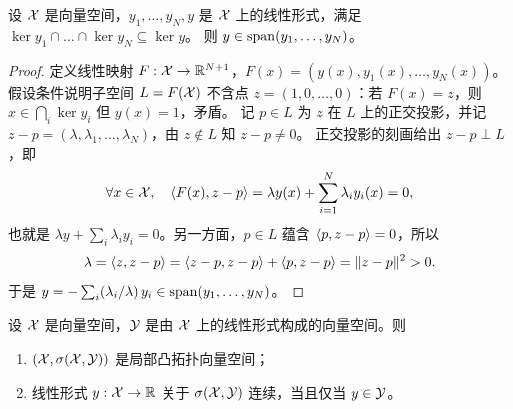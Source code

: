 \begin{lemma}
\label{res:75}
设 $\mathcal{X}$ 是向量空间，$y_1,\dots,y_N,y$ 是 $\mathcal{X}$ 上的线性形式，满足 $\ker y_1\cap\dots\cap\ker y_N\subseteq\ker y$。
则 $y\in\operatorname{span}(y_1,\dots,y_N)$。
\end{lemma}

\begin{proof}
定义线性映射 $F:\mathcal{X}\to\mathbb{R}^{N+1}$，$F(x)=(y(x),y_1(x),\dots,y_N(x))$。
假设条件说明子空间 $L=F(\mathcal{X})$ 不含点 $z=(1,0,\dots,0)$：若 $F(x)=z$，则 $x\in\bigcap_i\ker y_i$ 但 $y(x)=1$，矛盾。
记 $p\in L$ 为 $z$ 在 $L$ 上的正交投影，并记 $z-p=(\lambda,\lambda_1,\dots,\lambda_N)$，由 $z\notin L$ 知 $z-p\neq0$。
正交投影的刻画给出 $z-p\perp L$，即
\[
  \forall x\in\mathcal{X},\quad \langle F(x), z-p\rangle=\lambda y(x)+\sum_{i=1}^N\lambda_iy_i(x)=0,
\]
也就是 $\lambda y+\sum_i\lambda_iy_i=0$。另一方面，$p\in L$ 蕴含 $\langle p, z-p\rangle=0$，所以
\[
  \lambda=\langle z, z-p\rangle=\langle z-p, z-p\rangle+\langle p, z-p\rangle=\lVert z-p\rVert^2>0 .
\]
于是 $y=-\sum_i(\lambda_i/\lambda)\,y_i\in\operatorname{span}(y_1,\dots,y_N)$。
\end{proof}

\begin{proposition}
\label{res:73}
设 $\mathcal{X}$ 是向量空间，$\mathcal{Y}$ 是由 $\mathcal{X}$ 上的线性形式构成的向量空间。则
\begin{enumerate}[label=(\roman*)]
  \item $(\mathcal{X},\sigma(\mathcal{X},\mathcal{Y}))$ 是局部凸拓扑向量空间；
  \item 线性形式 $y:\mathcal{X}\to\mathbb{R}$ 关于 $\sigma(\mathcal{X},\mathcal{Y})$ 连续，当且仅当 $y\in\mathcal{Y}$。
\end{enumerate}
\end{proposition}

